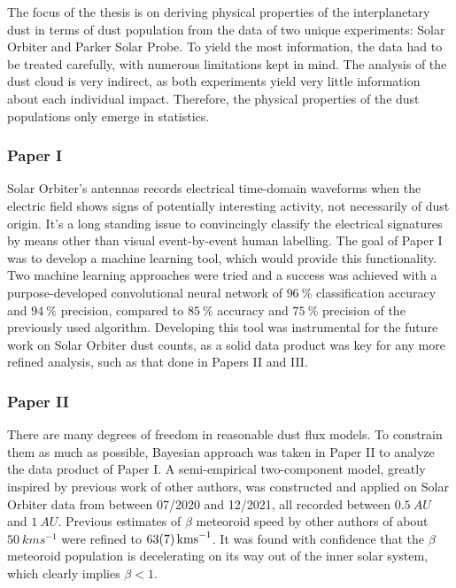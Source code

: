 The focus of the thesis is on deriving physical properties of the interplanetary dust in terms of dust population from the data of two unique experiments: Solar Orbiter and Parker Solar Probe. To yield the most information, the data had to be treated carefully, with numerous limitations kept in mind. The analysis of the dust cloud is very indirect, as both experiments yield very little information about each individual impact. Therefore, the physical properties of the dust populations only emerge in statistics. 

\subsubsection{Paper I}

Solar Orbiter's antennas records electrical time-domain waveforms when the electric field shows signs of potentially interesting activity, not necessarily of dust origin. It's a long standing issue to convincingly classify the electrical signatures by means other than visual event-by-event human labelling. The goal of Paper I was to develop a machine learning tool, which would provide this functionality. Two machine learning approaches were tried and a success was achieved with a purpose-developed convolutional neural network of $\SI{96}{\%}$ classification accuracy and $\SI{94}{\%}$ precision, compared to $\SI{85}{\%}$ accuracy and $\SI{75}{\%}$ precision of the previously used algorithm. Developing this tool was instrumental for the future work on Solar Orbiter dust counts, as a solid data product was key for any more refined analysis, such as that done in Papers II and III. 

\subsubsection{Paper II}

There are many degrees of freedom in reasonable dust flux models. To constrain them as much as possible, Bayesian approach was taken in Paper II to analyze the data product of Paper I. A semi-empirical two-component model, greatly inspired by previous work of other authors, was constructed and applied on Solar Orbiter data from between 07/2020 and 12/2021, all recorded between $\SI{0.5}{AU}$ and $\SI{1}{AU}$. Previous estimates of $\beta$ meteoroid speed by other authors of about $\SI{50}{kms^{-1}}$ were refined to $\SI{63 \pm 7}{kms^{-1}}$. It was found with confidence that the $\beta$ meteoroid population is decelerating on its way out of the inner solar system, which clearly implies $\beta < 1$. 

